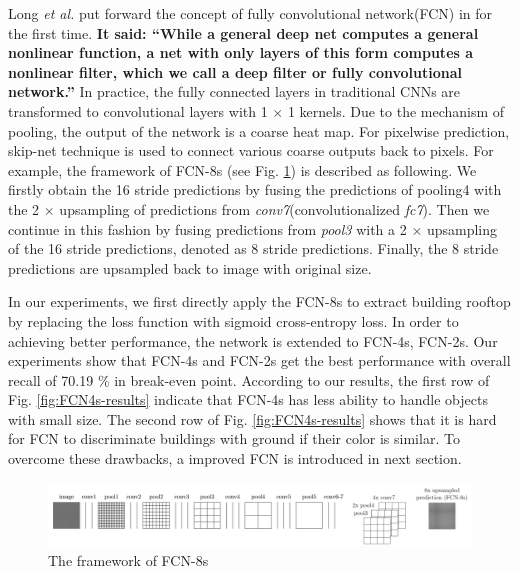 \documentclass[runningheads]{llncs}
\begin{document}
	Long  \textit{et al.} put forward the concept of fully convolutional network(FCN) in \cite{Long2014Fully} for the first time. \textbf{It said: ``While a general deep net computes a general nonlinear function, a net with only layers of this form computes a nonlinear filter, which we call a deep filter or fully convolutional network.''} In practice, the fully connected layers in traditional CNNs are transformed to convolutional layers with 1 $\times$ 1 kernels. Due to the mechanism of pooling, the output of the network is a coarse heat map. For pixelwise prediction, skip-net technique is used to connect various coarse outputs back to pixels.  For example, the framework of FCN-8s (see Fig. \ref{fig:Fig1FCN8s}) is described as following. We firstly obtain the 16 stride predictions by fusing the predictions of pooling4 with the 2 $\times$ upsampling of predictions from \textit{conv7}(convolutionalized \textit{fc7}). Then we continue in this fashion by fusing predictions from \textit{pool3} with a 2 $\times$ upsampling of the 16 stride predictions, denoted as 8 stride predictions. Finally, the 8 stride predictions are upsampled back to image with original size. 
	 
	In our experiments, we first directly apply the FCN-8s to extract building rooftop by replacing the loss function with sigmoid cross-entropy loss. In order to achieving better performance, the network is extended to FCN-4s, FCN-2s. Our experiments show that FCN-4s and FCN-2s get the best performance with overall recall of 70.19 $\%$ in break-even point. According to our results, the first row of Fig. \ref{fig:FCN4s-results} indicate that FCN-4s has less ability to handle  objects with small size. The second row of Fig. \ref{fig:FCN4s-results} shows that it is hard for FCN to discriminate buildings with ground if their color is similar. To overcome these drawbacks, a improved FCN is introduced in next section. 
	 
\begin{figure}
\centering
\label{fig:Fig1FCN8s}
\includegraphics[width=120mm]{FCN8s}
\caption{The framework of FCN-8s}
\end{figure}
	
\end{document}
